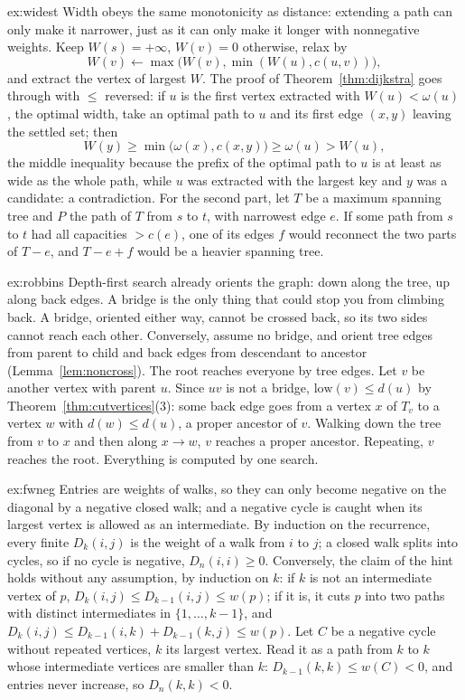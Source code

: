 \begin{solution}{ex:widest}
\idea Width obeys the same monotonicity as distance: extending a path can only make it narrower, just as it can only make it longer with nonnegative weights.
\writeup Keep $W(s)=+\infty$, $W(v)=0$ otherwise, relax by
\[
W(v)\gets\max\big(W(v),\min(W(u),c(u,v))\big),
\]
and extract the vertex of largest $W$. The proof of Theorem~\ref{thm:dijkstra} goes through with $\le$ reversed: if $u$ is the first vertex
extracted with $W(u)<\omega(u)$, the optimal width, take an optimal path to $u$ and its first edge $(x,y)$ leaving the settled set; then
\[
W(y)\ge\min\big(\omega(x),c(x,y)\big)\ge\omega(u)>W(u),
\]
the middle inequality because the prefix of the optimal path to $u$ is at least as wide as the whole path, while $u$ was extracted with the largest key and $y$ was a candidate: a contradiction. For the second part, let $T$ be a maximum spanning tree and $P$ the path of $T$ from $s$ to $t$, with narrowest edge $e$. If some path from $s$ to $t$ had all capacities $>c(e)$, one of its edges $f$ would reconnect the two parts of $T-e$, and $T-e+f$ would be a heavier spanning tree.
\end{solution}

\begin{solution}{ex:robbins}
\idea Depth-first search already orients the graph: down along the tree, up along back edges. A bridge is the only thing that could stop you from climbing back.
\writeup A bridge, oriented either way, cannot be crossed back, so its two sides cannot reach each other. Conversely, assume no bridge, and orient tree edges from parent to child and back edges from descendant to ancestor (Lemma~\ref{lem:noncross}).
The root reaches everyone by tree edges. Let $v$ be another vertex with parent $u$. Since $uv$ is not a bridge, $\mathrm{low}(v)\le d(u)$ by Theorem~\ref{thm:cutvertices}(3): some back edge goes from a vertex $x$ of $T_v$ to a vertex $w$ with $d(w)\le d(u)$,
a proper ancestor of $v$. Walking down the tree from $v$ to $x$ and then along $x\to w$, $v$ reaches a proper ancestor. Repeating, $v$ reaches the root. Everything is computed by one search.
\end{solution}

\begin{solution}{ex:fwneg}
\idea Entries are weights of walks, so they can only become negative on the diagonal by a negative closed walk; and a negative cycle is caught when its largest vertex is allowed as an intermediate.
\writeup By induction on the recurrence, every finite $D_k(i,j)$ is the weight of a walk from $i$ to $j$; a closed walk splits into cycles, so if no cycle is negative, $D_n(i,i)\ge0$. Conversely, the claim of the hint holds without any assumption, by induction on $k$: if
$k$ is not an intermediate vertex of $p$, $D_k(i,j)\le D_{k-1}(i,j)\le w(p)$; if it is, it cuts $p$ into two paths with distinct intermediates in $\{1,\dots,k-1\}$, and $D_k(i,j)\le D_{k-1}(i,k)+D_{k-1}(k,j)\le w(p)$. Let $C$ be a negative cycle without repeated vertices, $k$
its largest vertex. Read it as a path from $k$ to $k$ whose intermediate vertices are smaller than $k$: $D_{k-1}(k,k)\le w(C)<0$, and entries never increase, so $D_n(k,k)<0$.
\end{solution}

